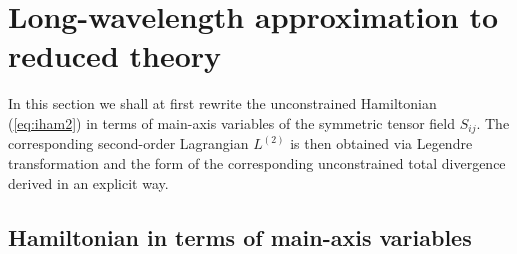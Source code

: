\documentclass[a4paper,12pt]{article}
\begin{document}

\section{Long-wavelength approximation to reduced theory}


\label{sec:V}

In this section we shall at first rewrite the
unconstrained Hamiltonian (\ref{eq:iham2}) in terms of main-axis variables
of the symmetric tensor field $S_{ij}$.
The corresponding second-order Lagrangian $L^{(2)}$ is then obtained
via Legendre transformation and the form of the corresponding
unconstrained total divergence derived in an explicit way.



\subsection{Hamiltonian in terms of main-axis variables}



\label{secIV2}
\end{document}
